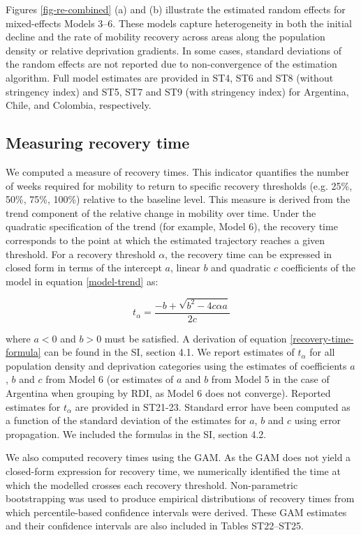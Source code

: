 \documentclass[fleqn,10pt]{wlscirep}
\begin{document}
Figures \ref{fig-re-combined} (a) and (b) illustrate the estimated random effects for mixed-effects Models 3--6. These models capture heterogeneity in both the initial decline and the rate of mobility recovery across areas along the population density or relative deprivation gradients. In some cases, standard deviations of the random effects are not reported due to non-convergence of the estimation algorithm. Full model estimates are provided in ST4, ST6 and ST8 (without stringency index) and ST5, ST7 and ST9 (with stringency index) for Argentina, Chile, and Colombia, respectively.


\subsection*{Measuring recovery time}

We computed a measure of recovery times. This indicator quantifies the number of weeks required for mobility to return to specific recovery thresholds (e.g. 25\%, 50\%, 75\%, 100\%) relative to the baseline level. This measure is derived from the trend component of the relative change in mobility over time. Under the quadratic specification of the trend (for example, Model 6), the recovery time corresponds to the point at which the estimated trajectory reaches a given threshold. For a recovery threshold $\alpha$, the recovery time can be expressed in closed form in terms of the intercept $a$, linear $b$ and quadratic $c$ coefficients of the model in equation \eqref{model-trend} as:

\begin{equation}\label{recovery-time-formula}
    t_{\alpha} = \dfrac{-b + \sqrt{b^2-4c \alpha a}}{2c}
\end{equation}

where $a<0$ and $b>0$ must be satisfied. A derivation of equation \eqref{recovery-time-formula} can be found in the SI, section 4.1. We report estimates of $t_{\alpha}$ for all population density and deprivation categories using the estimates of coefficients $a$, $b$ and $c$ from Model 6 (or estimates of $a$ and $b$ from Model 5 in the case of Argentina when grouping by RDI, as Model 6 does not converge). Reported estimates for $t_{\alpha}$ are provided in ST21-23. Standard error have been computed as a function of the standard deviation of the estimates for $a$, $b$ and $c$ using error propagation. We included the formulas in the SI, section 4.2.

We also computed recovery times using the GAM. As the GAM does not yield a closed-form expression for recovery time, we numerically identified the time at which the modelled crosses each recovery threshold. Non-parametric bootstrapping was used to produce empirical distributions of recovery times from which percentile-based confidence intervals were derived. These GAM estimates and their confidence intervals are also included in Tables ST22–ST25.
\end{document}
